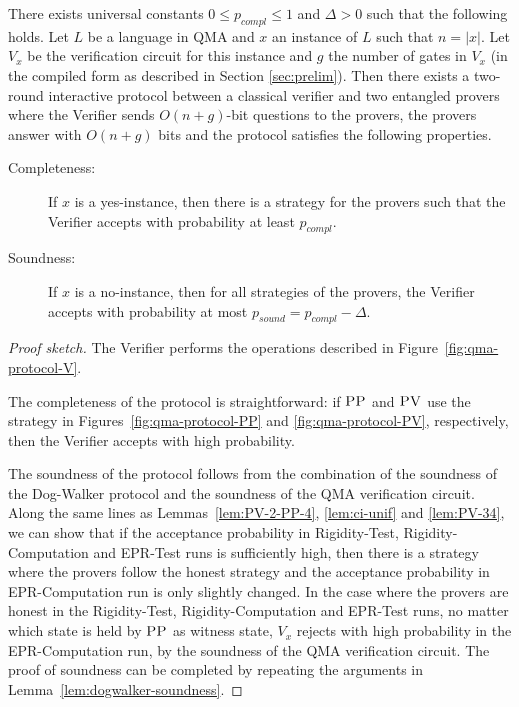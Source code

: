 \begin{lemma}\label{lem:qma}
There
  exists universal constants $0\leq p_{compl}\leq 1$ and $\Delta >0$ such that the following holds. 
Let $L$ be a language in QMA and $x$ an instance of $L$ such that $n = |x|$. Let  $V_x$ be the
  verification circuit for this instance and $g$ the number of gates in $V_x$
  (in the compiled form as described in Section \ref{sec:prelim}). Then there exists a two-round interactive protocol
between a classical verifier and two entangled provers where the Verifier
sends  $O(n + g)$-bit questions to the provers, the provers answer with $O(n + g)$ bits and the protocol satisfies the following properties.
\begin{description}
\item[Completeness:] If $x$ is a yes-instance, then  there is a strategy for the provers such that the Verifier accepts with probability  at least $p_{compl}$.
\item[Soundness:] If $x$ is a no-instance, then for all strategies of the provers, the Verifier accepts with  probability at most
$p_{sound} = p_{compl} - \Delta$.
\end{description}
\end{lemma}
\begin{proof}[Proof sketch]
The Verifier performs the operations described in Figure~\ref{fig:qma-protocol-V}. 

  The completeness of the protocol is straightforward: if $\textsc{PP}$ and $\textsc{PV}$ use the strategy in Figures~\ref{fig:qma-protocol-PP} and \ref{fig:qma-protocol-PV}, respectively, then the Verifier accepts with  high probability.

  The soundness of the protocol follows from the combination of the soundness of the
  Dog-Walker protocol and the soundness of the QMA verification circuit. Along the same lines as 
  Lemmas~\ref{lem:PV-2-PP-4}, \ref{lem:ci-unif} and \ref{lem:PV-34},
  we can show that if
  the acceptance probability in Rigidity-Test, Rigidity-Computation and
  EPR-Test runs
  is sufficiently high, then there is a strategy where the provers follow the honest
  strategy and the acceptance probability in EPR-Computation run is only slightly
  changed.  
  In the case where the provers are honest in the Rigidity-Test, Rigidity-Computation and EPR-Test runs, no matter which state is held
  by $\textsc{PP}$ as witness state, $V_x$ rejects with high probability in the EPR-Computation run, by the
  soundness of the QMA verification circuit.  The proof of soundness can be completed by repeating the
  arguments in Lemma~\ref{lem:dogwalker-soundness}.
\end{proof}

